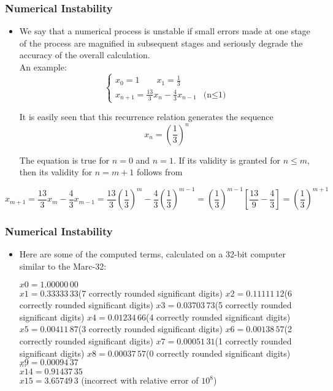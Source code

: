 \documentclass[notheorems,mathserif,table,compress]{beamer}  %
\begin{document}
\begin{frame}
\frametitle{Numerical Instability}
\begin{itemize}
\item We say that a numerical process is unstable if small errors made at one stage of the process are magnified in subsequent stages and seriously degrade the accuracy of the overall calculation.\\
An example:
\begin{displaymath}
\left\{ \begin{array}{ll}x_0=1\qquad x_1=\frac{1}{3}\\
x_{n+1}=\frac{13}{3}x_n-\frac{4}{3}x_{n-1} & \textrm{(n$\leq$1)} \end{array}\right.
\end{displaymath}

It is easily seen that this recurrence relation generates the sequence
\begin{displaymath}
x_n=(\frac{1}{3})^n
\end{displaymath}

The equation is true for $n=0$ and $n=1$. If its validity is granted for $n\leq m$, then its validity for $n=m+1$ follows from
\end{itemize}
\begin{displaymath}
x_{m+1}=\frac{13}{3}x_m-\frac{4}{3}x_{m-1}=\frac{13}{3}(\frac{1}{3})^m-\frac{4}{3}(\frac{1}{3})^{m-1}=(\frac{1}{3})^{m-1}[\frac{13}{9}-\frac{4}{3}]=(\frac{1}{3})^{m+1}
\end{displaymath}

\end{frame}

\begin{frame}
\frametitle{Numerical Instability}
\begin{itemize}
\item Here are some of the computed terms, calculated on a 32-bit computer similar to the Marc-32:
\begin{flushleft}
$x0 = 1.00000\,00$\\
$x1 = 0.33333\,33$\qquad(7 correctly rounded significant digits)
$x2 = 0.11111\,12$\qquad(6 correctly rounded significant digits)
$x3 = 0.03703\,73$\qquad(5 correctly rounded significant digits) 
$x4 = 0.01234\,66$\qquad(4 correctly rounded significant digits)
$x5 = 0.00411\,87$\qquad(3 correctly rounded significant digits) 
$x6 = 0.00138\,57$\qquad(2 correctly rounded significant digits)
$x7 = 0.00051\,31$\qquad(1 correctly rounded significant digits) 
$x8 = 0.00037\,57$\qquad(0 correctly rounded significant digits) 
$x9 = 0.00094\,37$\\
$\cdots$ \\
$x14 = 0.91437\,35$\\ 
$x15 = 3.65749\,3$ \qquad (incorrect with relative error of $10^8$)
\end{flushleft}

\end{itemize}
\end{frame}
\end{document}

